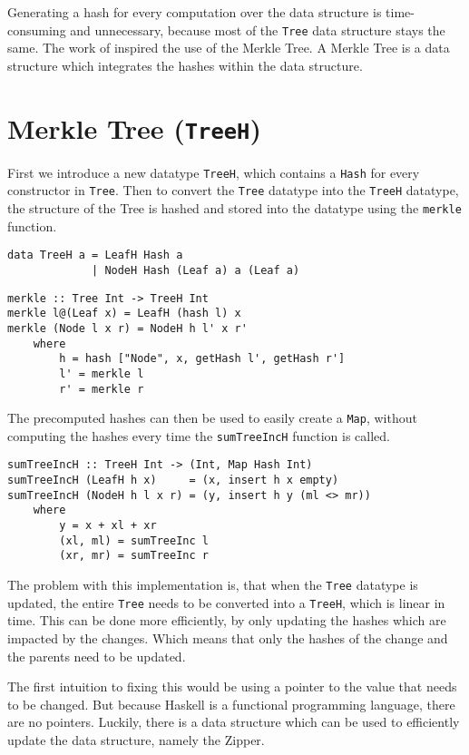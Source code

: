 Generating a hash for every computation over the data structure is time-consuming and unnecessary, because most of the \texttt{Tree} data structure stays the same. The work of \citeauthor{miraldo2019efficient}\cite{miraldo2019efficient} inspired the use of the Merkle Tree. A Merkle Tree is a data structure which integrates the hashes within the data structure.

\section{Merkle Tree (\texttt{TreeH})}
First we introduce a new datatype \texttt{TreeH}, which contains a \texttt{Hash} for every constructor in \texttt{Tree}. Then to convert the \texttt{Tree} datatype into the \texttt{TreeH} datatype, the structure of the Tree is hashed and stored into the datatype using the \texttt{merkle} function.

\begin{verbatim}
data TreeH a = LeafH Hash a
             | NodeH Hash (Leaf a) a (Leaf a)
\end{verbatim}

\begin{verbatim}
merkle :: Tree Int -> TreeH Int
merkle l@(Leaf x) = LeafH (hash l) x
merkle (Node l x r) = NodeH h l' x r'
    where
        h = hash ["Node", x, getHash l', getHash r']
        l' = merkle l
        r' = merkle r
\end{verbatim}

The precomputed hashes can then be used to easily create a \texttt{Map}, without computing the hashes every time the \texttt{sumTreeIncH} function is called.

\begin{verbatim}
sumTreeIncH :: TreeH Int -> (Int, Map Hash Int)
sumTreeIncH (LeafH h x)     = (x, insert h x empty)
sumTreeIncH (NodeH h l x r) = (y, insert h y (ml <> mr))
    where
        y = x + xl + xr
        (xl, ml) = sumTreeInc l
        (xr, mr) = sumTreeInc r
\end{verbatim}

The problem with this implementation is, that when the \texttt{Tree} datatype is updated, the entire \texttt{Tree} needs to be converted into a \texttt{TreeH}, which is linear in time. This can be done more efficiently, by only updating the hashes which are impacted by the changes. Which means that only the hashes of the change and the parents need to be updated. 

The first intuition to fixing this would be using a pointer to the value that needs to be changed. But because Haskell is a functional programming language, there are no pointers. Luckily, there is a data structure which can be used to efficiently update the data structure, namely the Zipper\cite{huet1997zipper}.


